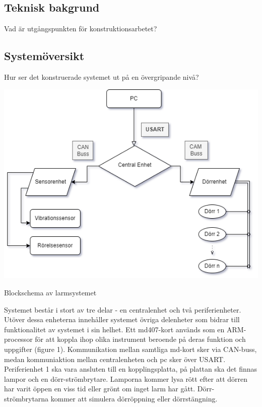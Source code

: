 \documentclass{article}
\begin{document}
\subsection{Teknisk bakgrund}
Vad är utgångspunkten för konstruktionsarbetet?

\subsection{Systemöversikt}
Hur ser det konstruerade systemet ut på en övergripande nivå?

\newpage

\includegraphics[scale=0.6]{Projektrapport/diagram.png}
\caption {Blockschema av larmsystemet}
\label{fig:drawing}


Systemet består i stort av tre delar - en centralenhet och två periferienheter. Utöver dessa enheterna innehåller systemet övriga delenheter som bidrar till funktionalitet av systemet i sin helhet. Ett md407-kort används som en ARM-processor för att koppla ihop olika instrument beroende på deras funktion och uppgifter (figure 1). Kommunikation mellan samtliga md-kort sker via CAN-buss, medan kommuniaktion mellan centralenheten och pc sker över USART. \\


Periferienhet 1 ska vara ansluten till en kopplingsplatta, på plattan ska det finnas lampor och en dörr-strömbrytare. Lamporna kommer lysa rött efter att dörren har varit öppen en viss tid eller grönt om inget larm har gått. Dörr-strömbrytarna kommer att simulera dörröppning eller dörrstängning. \\
\end{document}
